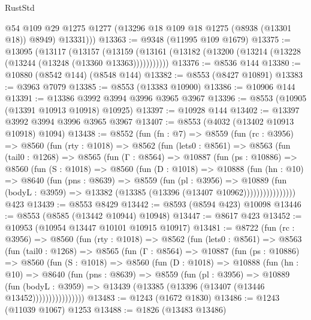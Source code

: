 \begin{lexlean}{RustStd}
\begin{coremodule}
          @54
          @109
          @29
          @1275
          @1277
          (@13296 @18 @109 @18 @1275 (@8938 (@13301 @18)) @8949)
          @13331)))
@13363 := @9348 (@11995 @109 @1679)
@13375 := @13095
    (@13117
      (@13157
        (@13159 (@13161 (@13182 (@13200 (@13214 (@13228 (@13244 (@13248 (@13360 @13363)))))))))))
@13376 := @8536 @144
@13380 := @10880 (@8542 @144) (@8548 @144)
@13382 := @8553 (@8427 @10891)
@13383 := @3963 @7079
@13385 := @8553 (@13383 @10900)
@13386 := @10906 @144
@13391 := @13386 @3992 @3994 @3996 @3965 @3967
@13396 := @8553 (@10905 (@13391 @10913 @10918) @10925)
@13397 := @10928 @144
@13402 := @13397 @3992 @3994 @3996 @3965 @3967
@13407 := @8553 (@4032 (@13402 @10913 @10918) @1094)
@13438 := @8552
    (fun (fn : @7) =>
    @8559
      (fun (rc : @3956) =>
      @8560
        (fun (rty : @1018) =>
        @8562
          (fun (lets0 : @8561) =>
          @8563
            (fun (tail0 : @1268) =>
            @8565
              (fun (Γ : @8564) =>
              @10887
                (fun (ps : @10886) =>
                @8560
                  (fun (S : @1018) =>
                  @8560
                    (fun (D : @1018) =>
                    @10888
                      (fun (hn : @10) =>
                      @8640
                        (fun (pns : @8639) =>
                        @8559
                          (fun (pl : @3956) =>
                          @10889
                            (fun (bodyL : @3959) =>
                            @13382 (@13385 (@13396 (@13407 @10962))))))))))))))))
    @423
@13439 := @8553 @8429
@13442 := @8593 (@8594 @423) @10098
@13446 := @8553 (@8585 (@13442 @10944) @10948)
@13447 := @8617 @423
@13452 := @10953 (@10954 @13447 @10101 @10915 @10917)
@13481 := @8722
    (fun (rc : @3956) =>
    @8560
      (fun (rty : @1018) =>
      @8562
        (fun (lets0 : @8561) =>
        @8563
          (fun (tail0 : @1268) =>
          @8565
            (fun (Γ : @8564) =>
            @10887
              (fun (ps : @10886) =>
              @8560
                (fun (S : @1018) =>
                @8560
                  (fun (D : @1018) =>
                  @10888
                    (fun (hn : @10) =>
                    @8640
                      (fun (pns : @8639) =>
                      @8559
                        (fun (pl : @3956) =>
                        @10889
                          (fun (bodyL : @3959) =>
                          @13439 (@13385 (@13396 (@13407 (@13446 @13452))))))))))))))))
@13483 := @1243 (@1672 @1830)
@13486 := @1243 (@11039 @1067) @1253
@13488 := @1826 (@13483 @13486)

\end{coremodule}
\end{lexlean}
